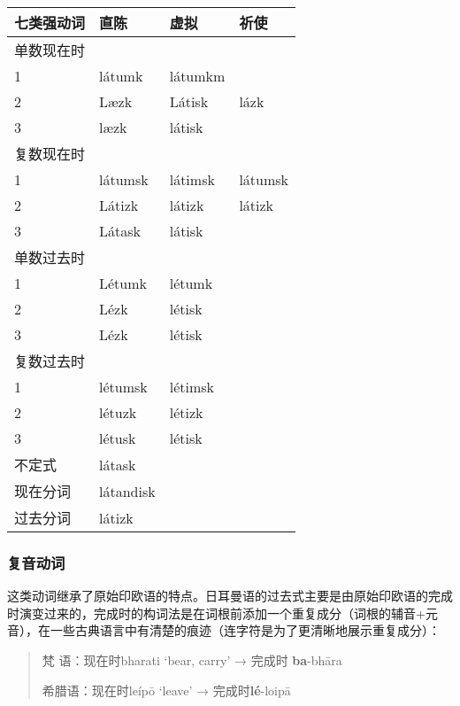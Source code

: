 \begin{longtable}{llll}
    \toprule
    七类强动词 & 直陈        & 虚拟      & 祈使      \\
    \midrule
    \endhead
    \bottomrule
    \endfoot
    单数现在时 &           &         &         \\
    1     & látumk    & látumkm &         \\
    2     & Læzk      & Látisk  & lázk    \\
    3     & læzk      & látisk  &         \\
    复数现在时 &           &         &         \\
    1     & látumsk   & látimsk & látumsk \\
    2     & Látizk    & látizk  & látizk  \\
    3     & Látask    & látisk  &         \\
    单数过去时 &           &         &         \\
    1     & Létumk    & létumk  &         \\
    2     & Lézk      & létisk  &         \\
    3     & Lézk      & létisk  &         \\
    复数过去时 &           &         &         \\
    1     & létumsk   & létimsk &         \\
    2     & létuzk    & létizk  &         \\
    3     & létusk    & létisk  &         \\
    不定式   & látask    &         &         \\
    现在分词  & látandisk &         &         \\
    过去分词  & látizk    &         &         \\
\end{longtable}

\subsubsection{复音动词}

这类动词继承了原始印欧语的特点。日耳曼语的过去式主要是由原始印欧语的完成时演变过来的，完成时的构词法是在词根前添加一个重复成分（词根的辅音+元音），在一些古典语言中有清楚的痕迹（连字符是为了更清晰地展示重复成分）：

\begin{quote}
    梵 语：现在时bharati `bear, carry' → 完成时 \textbf{ba}-bhāra

    希腊语：现在时leípō `leave' → 完成时\textbf{lé}-loipā
\end{quote}


